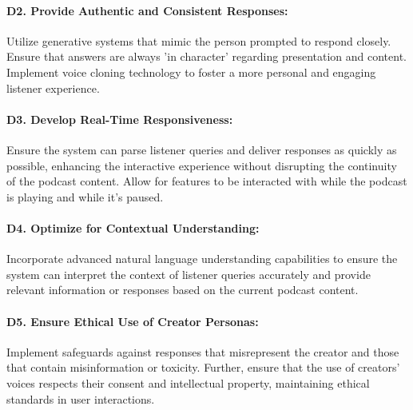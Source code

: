 \documentclass[12pt]{report}
\begin{document}
\begin{myfont}
        \paragraph{D2. Provide Authentic and Consistent Responses:} Utilize generative systems that mimic the person prompted to respond closely. Ensure that answers are always 'in character' regarding presentation and content. Implement voice cloning technology to foster a more personal and engaging listener experience.
        
        \paragraph{D3. Develop Real-Time Responsiveness:} Ensure the system can parse listener queries and deliver responses as quickly as possible, enhancing the interactive experience without disrupting the continuity of the podcast content. Allow for features to be interacted with while the podcast is playing and while it's paused.
        
        \paragraph{D4. Optimize for Contextual Understanding:} Incorporate advanced natural language understanding capabilities to ensure the system can interpret the context of listener queries accurately and provide relevant information or responses based on the current podcast content.

        \paragraph{D5. Ensure Ethical Use of Creator Personas:} Implement safeguards against responses that misrepresent the creator and those that contain misinformation or toxicity. Further, ensure that the use of creators’ voices respects their consent and intellectual property, maintaining ethical standards in user interactions. 

        \clearpage


\end{myfont}
\end{document}
